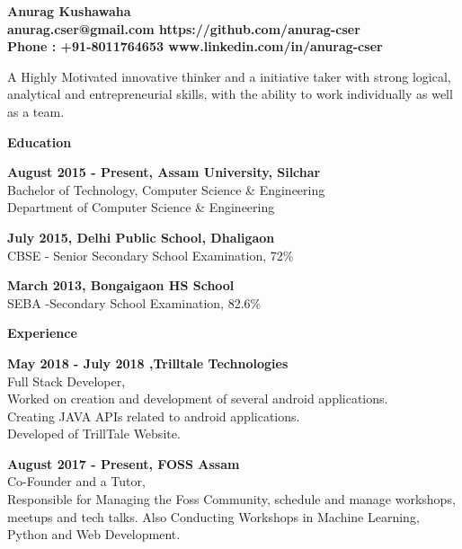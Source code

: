 \documentclass[a4paper,11pt,final]{memoir}
\newcommand{\Sep}{\vspace{1.5em}}
\newcommand{\SmallSep}{\vspace{0.5em}}
\newcommand{\CVSection}[1]
	{\Large\textbf{#1}\par
	\SmallSep\normalsize\normalfont}
\newcommand{\CVItem}[1]
	{\textbf{\color{RoyalBlue} #1}}
\begin{document}
\begin{figure}

\end{figure}

\begin{flushright}\small

\end{flushright}\normalsize
\framebreak


\Huge\bfseries {\color{RoyalBlue} Anurag Kushawaha } \\
\small anurag.cser@gmail.com \hspace{5mm} https://github.com/anurag-cser  \\
Phone : +91-8011764653 \hspace{3mm} www.linkedin.com/in/anurag-cser\\
\normalsize\normalfont

A Highly Motivated innovative thinker and a initiative taker with strong logical, analytical and entrepreneurial skills, with the ability to work individually as well as a team.

\CVSection{Education}
\CVItem{August 2015 - Present, Assam University, Silchar }\\
Bachelor of Technology, Computer Science \& Engineering\\
Department of Computer Science \& Engineering
\SmallSep

\CVItem{July 2015, Delhi Public School, Dhaligaon}\\
CBSE - Senior Secondary School Examination, 72\%
\SmallSep

\CVItem{March 2013, Bongaigaon HS School}\\
SEBA -Secondary School Examination, 82.6\%
\Sep

\CVSection{Experience}
\CVItem{May 2018 - July 2018 ,Trilltale Technologies }\\
Full Stack Developer,\\
Worked on creation and development of several android applications. \\
Creating JAVA APIs related to android
applications. \\
Developed of TrillTale Website.
\SmallSep

\CVItem{August 2017 - Present, FOSS Assam}\\
Co-Founder and a Tutor,\\
Responsible for Managing the Foss Community, schedule and manage workshops, meetups and tech talks.
Also Conducting Workshops in Machine Learning, Python and Web Development.
\SmallSep
\end{document}
